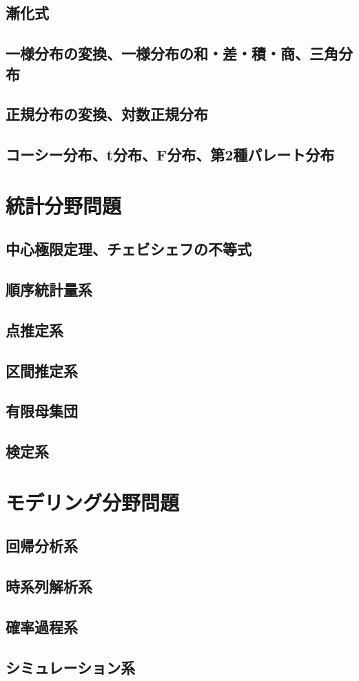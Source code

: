 \documentclass{jsbook}
\begin{document}
\newpage
\section{漸化式}
\newpage
\section{一様分布の変換、一様分布の和・差・積・商、三角分布}
\newpage
\section{正規分布の変換、対数正規分布}
\newpage
\section{コーシー分布、t分布、F分布、第2種パレート分布}

\chapter{統計分野問題}
\section{中心極限定理、チェビシェフの不等式}
\newpage
\section{順序統計量系}
\newpage
\section{点推定系}
\newpage
\section{区間推定系}
\newpage
\section{有限母集団}
\newpage
\section{検定系}

\chapter{モデリング分野問題}
\section{回帰分析系}
\newpage
\section{時系列解析系}
\newpage
\section{確率過程系}
\newpage
\section{シミュレーション系}
\begin{equation}
\end{equation}

\begin{equation}
\end{equation}

\begin{equation}
\end{equation}
\end{document}
